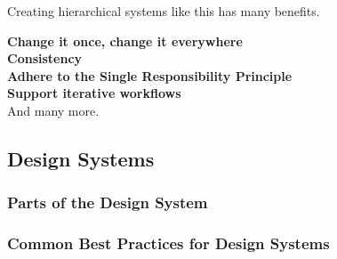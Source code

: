 Creating hierarchical systems like this has many benefits.

\textbf{Change it once, change it everywhere}\\

\textbf{Consistency}\\

\textbf{Adhere to the Single Responsibility Principle}\\

\textbf{Support iterative workflows}\\

And many more.


\subsection{Design Systems}
\subsubsection{Parts of the Design System}
\subsubsection{Common Best Practices for Design Systems}